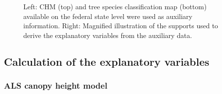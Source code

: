 \begin{figure}[H]
	\centering
	\caption{Left: CHM (top) and tree species classification map (bottom) available on the federal state level were used as auxiliary information. Right: Magnified illustration of the supports used to derive the explanatory variables from the auxiliary data.}
	\label{fig:Auxvars}
\end{figure}




\subsection{Calculation of the explanatory variables}
\label{sec:expvarcalc}

\subsubsection{ALS canopy height model}

